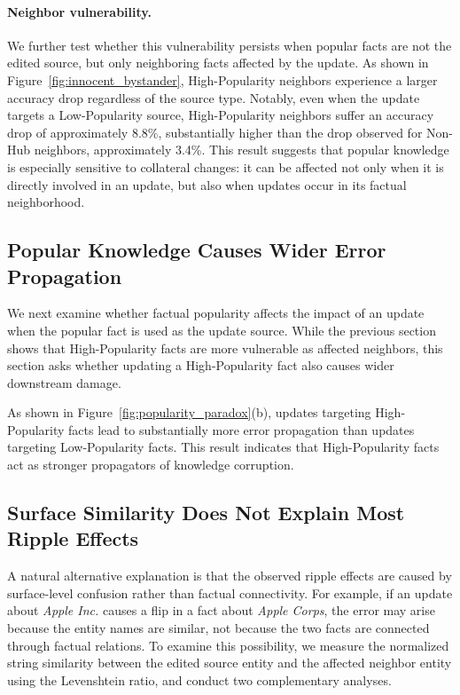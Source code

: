 \paragraph{Neighbor vulnerability.}
We further test whether this vulnerability persists when popular facts are not the edited source, but only neighboring facts affected by the update. 
As shown in Figure~\ref{fig:innocent_bystander}, High-Popularity neighbors experience a larger accuracy drop regardless of the source type. 
Notably, even when the update targets a Low-Popularity source, High-Popularity neighbors suffer an accuracy drop of approximately 8.8\%, substantially higher than the drop observed for Non-Hub neighbors, approximately 3.4\%. 
This result suggests that popular knowledge is especially sensitive to collateral changes: it can be affected not only when it is directly involved in an update, but also when updates occur in its factual neighborhood.


\subsection{Popular Knowledge Causes Wider Error Propagation}
\label{subsec:popular_propagation}
We next examine whether factual popularity affects the impact of an update when the popular fact is used as the update source. While the previous section shows that High-Popularity facts are more vulnerable as affected neighbors, this section asks whether updating a High-Popularity fact also causes wider downstream damage.

As shown in Figure~\ref{fig:popularity_paradox}(b), updates targeting High-Popularity facts lead to substantially more error propagation than updates targeting Low-Popularity facts. This result indicates that High-Popularity facts act as stronger propagators of knowledge corruption. 

\subsection{Surface Similarity Does Not Explain Most Ripple Effects}
\label{subsec:semantic_control}

A natural alternative explanation is that the observed ripple effects are caused by surface-level confusion rather than factual connectivity. For example, if an update about \textit{Apple Inc.} causes a flip in a fact about \textit{Apple Corps}, the error may arise because the entity names are similar, not because the two facts are connected through factual relations. To examine this possibility, we measure the normalized string similarity between the edited source entity and the affected neighbor entity using the Levenshtein ratio, and conduct two complementary analyses.


